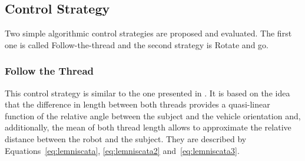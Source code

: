 \documentclass[journal]{IEEEtran}
\begin{document}
%
%
%
%



\subsection{Control Strategy}

Two simple algorithmic control strategies are proposed and evaluated.  The first one is called Follow-the-thread and the second strategy is Rotate and go.  %

\subsubsection{Follow the Thread}

This control strategy is similar to the one presented in \cite{Ortlieb2016}. It is based on the idea that the difference in length between both threads provides a quasi-linear function of the relative angle between the subject and the vehicle orientation and, additionally, the mean of both thread length allows to approximate the relative distance between the robot and the subject.  They are described by Equations~\ref{eq:lemniscata}, \ref{eq:lemniscata2} and~\ref{eq:lemniscata3}.
\end{document}
